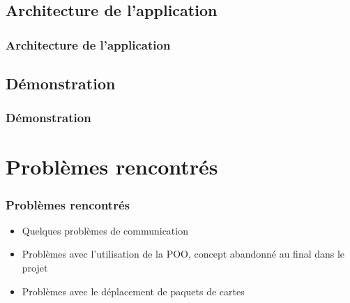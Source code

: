 \documentclass[11pt]{beamer}
\begin{document}
\subsection{Architecture de l'application}
\begin{frame}
\frametitle{Architecture de l'application}
\end{frame}

\subsection{Démonstration}
\begin{frame}
\frametitle{Démonstration}
\begin{figure}
\end{figure}
\end{frame}

\section{Problèmes rencontrés}
\begin{frame}
\frametitle{Problèmes rencontrés}
\begin{itemize}
\item Quelques problèmes de communication 
\item Problèmes avec l'utilisation de la POO, concept abandonné au final dans le projet
\item Problèmes avec le déplacement de paquets de cartes 
\end{itemize}
\end{frame}
\end{document}
